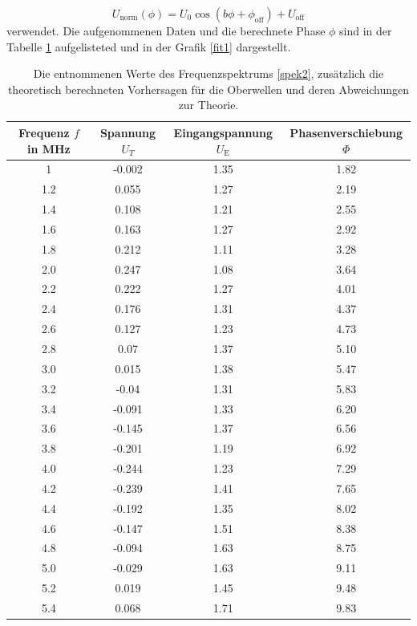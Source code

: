 $$ U_\text{norm}(\phi)=U_0\cos(b\phi +\phi_\text{off})+U_\text{off}$$
verwendet. Die aufgenommenen Daten und die berechnete Phase $\phi$ sind in der
Tabelle \ref{Tab3} aufgelisteted und in der Grafik \ref{fit1} dargestellt.
\begin{table}
  \centering
  \caption{Die entnommenen Werte des Frequenzspektrums \ref{spek2}, zusätzlich
  die theoretisch berechneten Vorhersagen für die Oberwellen und deren
  Abweichungen zur Theorie.}
  \label{Tab3}
  \begin{tabular}{c|c|c|c}
    \toprule
Frequenz $f$ in MHz & Spannung $U_T$ &Eingangspannung $U_\text{E}$& Phasenverschiebung $\Phi$\\
    \midrule
    1 & -0.002 & 1.35  & 1.82  \\
    1.2& 0.055 &1.27  & 2.19  \\
    1.4& 0.108 & 1.21 &  2.55 \\
    1.6& 0.163 & 1.27  & 2.92  \\
    1.8& 0.212 &1.11  & 3.28  \\
    2.0& 0.247  &1.08  & 3.64  \\
    2.2& 0.222 & 1.27  & 4.01  \\
    2.4&  0.176&  1.31  & 4.37  \\
    2.6&  0.127&  1.23  & 4.73  \\
    2.8& 0.07 & 1.37   &  5.10 \\
    3.0 &0.015 &1.38   &  5.47 \\
    3.2 &-0.04 &1.31  & 5.83  \\
    3.4 & -0.091& 1.33  & 6.20  \\
    3.6 &-0.145 &1.37   & 6.56  \\
    3.8 &-0.201 &1.19  & 6.92  \\
    4.0 &-0.244 &1.23  &  7.29 \\
    4.2 &-0.239 &1.41  & 7.65  \\
    4.4& -0.192 &1.35  & 8.02  \\
    4.6& -0.147 & 1.51  & 8.38   \\
    4.8& -0.094 &1.63  & 8.75  \\
    5.0& -0.029 &1.63 & 9.11  \\
    5.2& 0.019 &1.45 & 9.48  \\
    5.4& 0.068 &1.71 &  9.83 \\

    \bottomrule
  \end{tabular}
\end{table}


